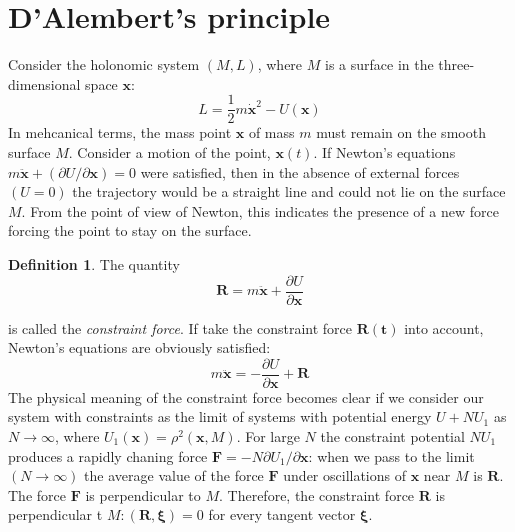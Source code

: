 \documentclass[conference]{IEEEtran}
\theoremstyle{definition}
\newtheorem{definition}{Definition}[section]
\theoremstyle{remark}
\begin{document}
    \section{D'Alembert's principle}
    Consider the holonomic system $(M, L)$, where $M$ is a surface in the three-dimensional space ${\mathbf{x}}$:
    \begin{equation*}
        L = \dfrac12m\dot{\mathbf{x}}^2 - U(\mathbf{x})
    \end{equation*}
    In mehcanical terms, the mass point $\mathbf{x}$ of mass $m$ must remain on the smooth surface $M$. Consider a motion of the point, $\mathbf{x}(t)$. If Newton's equations $m \ddot{\mathbf{x}} + (\partial U / \partial \mathbf{x}) = 0$ were satisfied, then in the absence of external forces $(U = 0)$ the trajectory would be a straight line and could not lie on the surface $M$. From the point of view of Newton, this indicates the presence of a new force forcing the point to stay on the surface.
    \begin{definition}
        The quantity
        \begin{equation*}
            \mathbf{R} = m \ddot{\mathbf{x}} + \dfrac{\partial U}{\partial \mathbf{x}}
        \end{equation*}
    \end{definition}
    is called the \emph{constraint force}. If take the constraint force $\mathbf{R(t)}$ into account, Newton's equations are obviously satisfied:
    \begin{equation*}
        m \ddot{\mathbf{x}} = -\dfrac{\partial U}{\partial \mathbf{x}} + \mathbf{R}
    \end{equation*}
    The physical meaning of the constraint force becomes clear if we consider our system with constraints as the limit of systems with potential energy $U + NU_1$ as $N \to \infty$, where $U_1(\mathbf{x}) = \rho^2 (\mathbf{x}, M)$. For large $N$ the constraint potential $NU_1$ produces a rapidly chaning force $\mathbf{F} = -N \partial U_1 / \partial \mathbf{x}$: when we pass to the limit $(N \to \infty)$ the average value of the force $\mathbf{F}$ under oscillations of $\mathbf{x}$ near $M$ is $\mathbf{R}$. The force $\mathbf{F}$ is perpendicular to $M$. Therefore, the constraint force $\mathbf{R}$ is perpendicular t $M: (\mathbf{R}, \bm{\xi}) = 0$ for every tangent vector $\bm{\xi}$.
\end{document}
